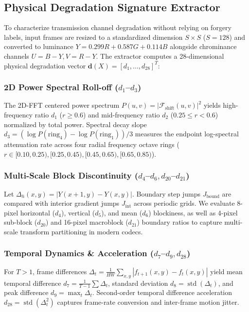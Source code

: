 \documentclass[conference]{IEEEtran}
\begin{document}
\subsection{Physical Degradation Signature Extractor}
To characterize transmission channel degradation without relying on forgery labels, input frames are resized to a standardized dimension $S \times S$ ($S=128$) and converted to luminance $Y = 0.299R + 0.587G + 0.114B$ alongside chrominance channels $U=B-Y, V=R-Y$. The extractor computes a 28-dimensional physical degradation vector $\mathbf{d}(X) = [d_1, \ldots, d_{28}]^T$:

\subsubsection{2D Power Spectral Roll-off ($d_1$--$d_3$)}
The 2D-FFT centered power spectrum $P(u, v) = |\mathcal{F}_{\text{shift}}(u, v)|^2$ yields high-frequency ratio $d_1$ ($r \ge 0.6$) and mid-frequency ratio $d_2$ ($0.25 \le r < 0.6$) normalized by total power. Spectral decay slope $d_3 = (\log P(\text{ring}_4) - \log P(\text{ring}_1))/3$ measures the endpoint log-spectral attenuation rate across four radial frequency octave rings ($r \in [0.10, 0.25), [0.25, 0.45), [0.45, 0.65), [0.65, 0.85)$).

\subsubsection{Multi-Scale Block Discontinuity ($d_4$--$d_6, d_{20}$--$d_{21}$)}
Let $\Delta_h(x, y) = |Y(x+1, y) - Y(x, y)|$. Boundary step jumps $J_{\text{bound}}$ are compared with interior gradient jumps $J_{\text{int}}$ across periodic grids. We evaluate 8-pixel horizontal ($d_4$), vertical ($d_5$), and mean ($d_6$) blockiness, as well as 4-pixel sub-block ($d_{20}$) and 16-pixel macroblock ($d_{21}$) boundary ratios to capture multi-scale transform partitioning in modern codecs.

\subsubsection{Temporal Dynamics \& Acceleration ($d_7$--$d_9, d_{28}$)}
For $T > 1$, frame differences $\Delta_t = \frac{1}{HW}\sum_{x,y} |f_{t+1}(x,y) - f_t(x,y)|$ yield mean temporal difference $d_7 = \frac{1}{T-1}\sum \Delta_t$, standard deviation $d_8 = \operatorname{std}(\Delta_t)$, and peak difference $d_9 = \max_t \Delta_t$. Second-order temporal difference acceleration $d_{28} = \operatorname{std}(\Delta^2_t)$ captures frame-rate conversion and inter-frame motion jitter.
\end{document}
